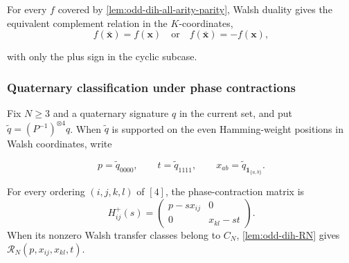 \documentclass[11pt,letterpaper,onecolumn]{article}
\theoremstyle{plain}
\theoremstyle{definition}
\theoremstyle{remark}
\newcommand{\one}{\mathbf 1}
\begin{document}
	For every \(f\) covered by \cref{lem:odd-dih-all-arity-parity}, Walsh
	duality gives the equivalent complement relation in the \(K\)-coordinates,
	\[
	f(\bar {\mathbf x})=f({\mathbf x})
	\quad\text{or}\quad
	f(\bar {\mathbf x})=-f({\mathbf x}),
	\]
	
	with only the plus sign in the cyclic subcase.
	

\subsubsection{Quaternary classification under phase contractions}
	Fix \(N\ge3\) and a quaternary signature \(q\) in the current set, and put
	\(\widetilde q=(P^{-1})^{\otimes4}q\).  When \(\widetilde q\) is supported
	on the even Hamming-weight positions in Walsh coordinates, write
	
	\begin{equation}
		p=\widetilde q_{0000},
		\qquad t=\widetilde q_{1111},
		\qquad x_{ab}=\widetilde q_{\one_{\{a,b\}}}.
		\label{eq:odd-dih-q4-coordinates}
	\end{equation}

For every ordering \((i,j,k,l)\) of \([4]\), the phase-contraction matrix is
\[
H_{ij}^+(s)=\begin{pmatrix}p-sx_{ij}&0\\0&x_{kl}-st\end{pmatrix}.
\]
When its nonzero Walsh transfer classes belong to \(C_N\),
\cref{lem:odd-dih-RN} gives \(\mathcal R_N(p,x_{ij},x_{kl},t)\).
\end{document}
